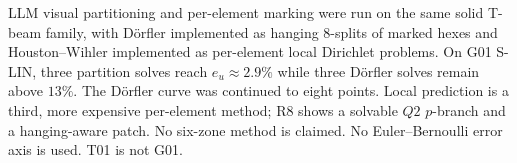 \documentclass[applsci,article,submit,pdftex,oneauthor]{Definitions/mdpi}
\begin{document}
LLM visual partitioning and per-element marking were run on the same solid T-beam family, with D{\"o}rfler implemented as hanging 8-splits of marked hexes and Houston--Wihler implemented as per-element local Dirichlet problems. On G01 S-LIN, three partition solves reach $e_u\approx 2.9\%$ while three D{\"o}rfler solves remain above $13\%$. The D{\"o}rfler curve was continued to eight points. Local prediction is a third, more expensive per-element method; R8 shows a solvable $Q2$ $p$-branch and a hanging-aware patch. No six-zone method is claimed. No Euler--Bernoulli error axis is used. T01 is not G01.

\vspace{6pt}



\end{document}
